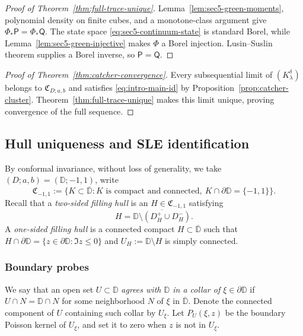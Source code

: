 \documentclass[11pt]{article}
\numberwithin{equation}{section}
\newcommand{\D}{\mathbb{D}}
\newcommand{\1}{\mathbf{1}}
\newcommand\ol[1]{\overline{#1}}
\begin{document}
\begin{proof}[Proof of Theorem~\ref{thm:full-trace-unique}]
Lemma~\ref{lem:sec5-green-moments}, polynomial density on finite cubes, and
a monotone-class argument give
\(\Phi_*\mathsf P=\Phi_*\mathsf Q\).
The state space \eqref{eq:sec5-continuum-state} is standard Borel, while
Lemma~\ref{lem:sec5-green-injective} makes
\(\Phi\) a Borel injection.
Lusin--Suslin theorem supplies a Borel inverse, so \(\mathsf P=\mathsf Q\).
\end{proof}


\begin{proof}[Proof of Theorem~\ref{thm:catcher-convergence}]
Every subsequential limit of \((K_\lambda^\delta)\) belongs to
\(\mathfrak C_{D;a,b}\) and satisfies \eqref{eq:intro-main-id} by
Proposition~\ref{prop:catcher-cluster}. Theorem~\ref{thm:full-trace-unique}
makes this limit unique, proving convergence of the full sequence.
\end{proof}

\subsection{Hull uniqueness and SLE identification}
\label{subsec:sec5-boundary-fans}

By conformal invariance, without loss of generality, we take
\((D;a,b)=(\D;-1,1)\), write
\[
 \mathfrak C_{-1,1}
 :=\{K\subset\ol\D:K\text{ is compact and connected},\
 K\cap\partial\D=\{-1,1\}\}.
\]
Recall that a \emph{two-sided filling hull} is an \(H\in\mathfrak C_{-1,1}\) satisfying
\begin{equation}\label{eq:sec5-hull-recovery}
 H=\ol{\D\setminus(D_H^+\cup D_H^-)}.
\end{equation}
A \emph{one-sided filling hull} is a connected compact \(H\subset\ol\D\)
such that \(H\cap\partial\D=\{z\in\partial\D:\Im z\leq0\}\) and \(U_H:=\D\setminus H\) is simply
connected.



\subsubsection{Boundary probes}

We say that an open set \(U\subset\D\) \emph{agrees with \(\D\) in a collar of
\(\xi\in\partial\D\)} if \(U\cap N=\D\cap N\) for some neighborhood
\(N\) of \(\xi\) in $\ol\D$.  Denote the connected component of $U$ containing such collar by $U_\xi$. Let \(P_U(\xi,z)\) be the boundary Poisson kernel of $U_\xi$, and set it to zero when \(z\) is not in $U_\xi$.
\end{document}
